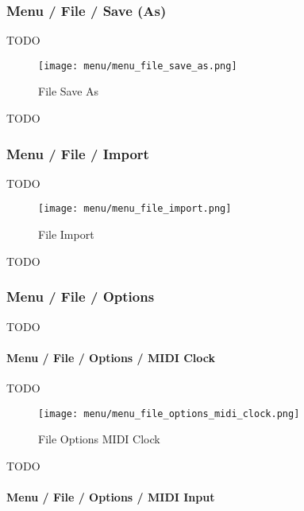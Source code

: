 \subsubsection{Menu / File / Save (As)}
\label{subsubsec:menu_file_open_save_as}

   TODO

\begin{figure}[H]
   \centering 
   \texttt{[image: menu/menu\_file\_save\_as.png]}
   \caption{File Save As}
   \label{fig:seq24_menu_file_save_as}
\end{figure}

   TODO

\subsubsection{Menu / File / Import}
\label{subsubsec:seq24_menu_file_import}

   TODO

\begin{figure}[H]
   \centering 
   \texttt{[image: menu/menu\_file\_import.png]}
   \caption{File Import}
   \label{fig:seq24_menu_file_import}
\end{figure}

   TODO

\subsubsection{Menu / File / Options}
\label{subsubsec:seq24_menu_file_options}

   TODO

\paragraph{Menu / File / Options / MIDI Clock}
\label{paragraph:seq24_menu_file_options_midi_clock}

   TODO

\begin{figure}[H]
   \centering 
   \texttt{[image: menu/menu\_file\_options\_midi\_clock.png]}
   \caption{File Options MIDI Clock}
   \label{fig:seq24_menu_file_options_midi_clock}
\end{figure}

   TODO

\paragraph{Menu / File / Options / MIDI Input}
\label{paragraph:seq24_menu_file_options_midi_input}

